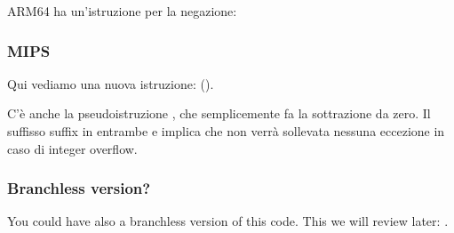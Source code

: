 ARM64 ha un'istruzione  per la negazione:



\subsubsection{MIPS}



Qui vediamo una nuova istruzione:  ().

C'è anche la pseudoistruzione  , che semplicemente fa la sottrazione da zero.
Il suffisso  suffix in entrambe  e  implica che non verrà sollevata nessuna eccezione in caso di integer overflow.

\subsubsection{Branchless version?}

You could have also a branchless version of this code. This we will review later: .
